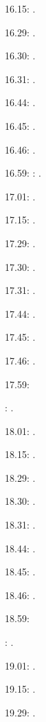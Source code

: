 \documentclass[italian]{article}
\begin{document}
16.15:     . 

16.29:     . 

16.30:     .

16.31:     .

16.44:     .

16.45:     .

16.46:     .

16.59:     
:    .

17.01:     . 

17.15:     . 

17.29:     . 

17.30:     .

17.31:     .

17.44:     .

17.45:     .

17.46:     .

17.59:     

:    .

18.01:     . 

18.15:     . 

18.29:     . 

18.30:     .

18.31:     .

18.44:     .

18.45:     .

18.46:     .

18.59:     

:    .

19.01:     . 

19.15:     . 

19.29:     . 
\end{document}
